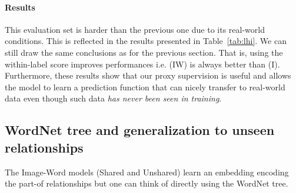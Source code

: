 \paragraph{Results} This evaluation set is harder than the previous
one due to its real-world conditions. This is reflected in the results
presented in Table~\ref{tab:lhi}.
%
We can still draw the same conclusions as for the previous section.
That is, using the within-label score improves performances i.e. (IW)
is always better than (I).
%
Furthermore, these results show that our proxy supervision is
useful and allows the model to learn a prediction function that
can nicely transfer to real-world data even though such data {\it has
  never been seen in training}.
%




\begin{table}[t!]
\begin{center}
\caption[Results on LHI data]{\textbf{Summary of Results on LHI data}\label{tab:lhi}}
\end{center}
\end{table}

\subsection{WordNet tree and generalization to unseen relationships}

The Image-Word models (Shared and Unshared) learn an embedding encoding the
part-of relationships but one can think of directly using the WordNet tree.


